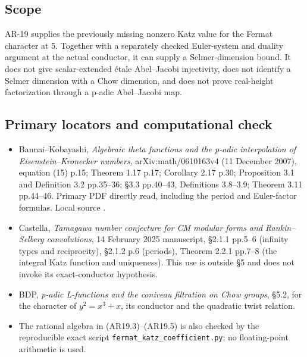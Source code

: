 \documentclass[11pt,a4paper]{article}
\providecommand{\tightlist}{\setlength{\itemsep}{0pt}\setlength{\parskip}{0pt}}
\begin{document}
\subsection{Scope}\label{scope}

AR-19 supplies the previously missing nonzero Katz value for the Fermat
character at 5. Together with a separately checked Euler-system and
duality argument at the actual conductor, it can supply a
Selmer-dimension bound. It does not give scalar-extended étale
Abel--Jacobi injectivity, does not identify a Selmer dimension with a
Chow dimension, and does not prove real-height factorization through a
p-adic Abel--Jacobi map.

\subsection{Primary locators and computational
check}\label{primary-locators-and-computational-check}

\begin{itemize}
\tightlist
\item
  Bannai--Kobayashi, \emph{Algebraic theta functions and the p-adic
  interpolation of Eisenstein--Kronecker numbers}, arXiv:math/0610163v4
  (11 December 2007), equation (15) p.15; Theorem 1.17 p.17; Corollary
  2.17 p.30; Proposition 3.1 and Definition 3.2 pp.35--36; §3.3
  pp.40--43, Definitions 3.8--3.9; Theorem 3.11 pp.44--46. Primary PDF
  directly read, including the period and Euler-factor formulas. Local
  source .
\item
  Castella, \emph{Tamagawa number conjecture for CM modular forms and
  Rankin--Selberg convolutions}, 14 February 2025 manuscript, §2.1.1
  pp.5--6 (infinity types and reciprocity), §2.1.2 p.6 (periods),
  Theorem 2.2.1 pp.7--8 (the integral Katz function and uniqueness).
  This use is outside §5 and does not invoke its exact-conductor
  hypothesis.
\item
  BDP, \emph{p-adic L-functions and the coniveau filtration on Chow
  groups}, §5.2, for the character of \(y^2=x^3+x\), its conductor and
  the quadratic twist relation.
\item
  The rational algebra in (AR19.3)--(AR19.5) is also checked by the
  reproducible exact script \texttt{fermat\_katz\_coefficient.py}; no
  floating-point arithmetic is used.
\end{itemize}
\end{document}
